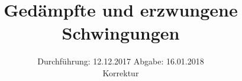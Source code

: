 

\subject{354}
\title{Gedämpfte und erzwungene Schwingungen}
\date{%
  Durchführung: 12.12.2017
  \hspace{3em}
  Abgabe: 16.01.2018  \\
  Korrektur
}



\maketitle
\thispagestyle{empty}
\tableofcontents
\newpage






\printbibliography{}


